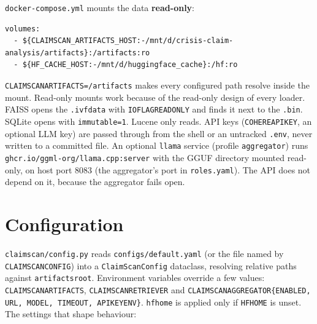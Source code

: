 \documentclass[11pt,a4paper]{article}
\makeatletter
\DeclareRobustCommand{\_}{\ifmmode\nfss@text{\textunderscore}\else\textunderscore\allowbreak\fi}
\newcommand{\file}[1]{\texttt{#1}}
\makeatother
\begin{document}
\file{docker-compose.yml} mounts the data \textbf{read-only}:
\begin{lstlisting}[style=yaml]
volumes:
  - ${CLAIMSCAN_ARTIFACTS_HOST:-/mnt/d/crisis-claim-analysis/artifacts}:/artifacts:ro
  - ${HF_CACHE_HOST:-/mnt/d/huggingface_cache}:/hf:ro
\end{lstlisting}
\texttt{CLAIMSCAN\_ARTIFACTS=/artifacts} makes every configured path resolve inside the mount. Read-only mounts work
because of the read-only design of every loader. FAISS opens the \texttt{.ivfdata} with \texttt{IO\_FLAG\_READ\_ONLY}
and finds it next to the \texttt{.bin}. SQLite opens with \texttt{immutable=1}. Lucene only reads. API keys
(\texttt{COHERE\_API\_KEY}, an optional LLM key) are passed through from the shell or an untracked \file{.env}, never
written to a committed file. An optional \texttt{llama} service (profile \texttt{aggregator}) runs
\texttt{ghcr.io/ggml-org/llama.cpp:server} with the GGUF directory mounted read-only, on host port 8083 (the
aggregator's port in \file{roles.yaml}). The API does not depend on it, because the aggregator fails open.

\section{Configuration}\label{sec:config}

\file{claimscan/config.py} reads \file{configs/default.yaml} (or the file named by \texttt{CLAIMSCAN\_CONFIG}) into a
\texttt{ClaimScanConfig} dataclass, resolving relative paths against \texttt{artifacts\_root}. Environment variables
override a few values: \texttt{CLAIMSCAN\_ARTIFACTS}, \texttt{CLAIMSCAN\_RETRIEVER} and
\texttt{CLAIMSCAN\_AGGREGATOR\_\{ENABLED, URL, MODEL, TIMEOUT, API\_KEY\_ENV\}}. \texttt{hf\_home} is applied only if
\texttt{HF\_HOME} is unset. The settings that shape behaviour:
\end{document}
